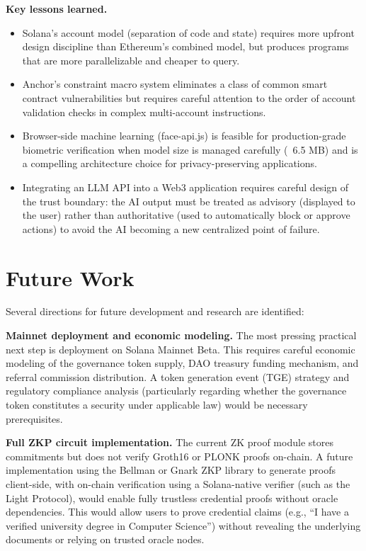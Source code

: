 \textbf{Key lessons learned.}
\begin{itemize}
    \item Solana's account model (separation of code and state) requires more upfront design discipline than Ethereum's combined model, but produces programs that are more parallelizable and cheaper to query.
    \item Anchor's constraint macro system eliminates a class of common smart contract vulnerabilities but requires careful attention to the order of account validation checks in complex multi-account instructions.
    \item Browser-side machine learning (face-api.js) is feasible for production-grade biometric verification when model size is managed carefully (~6.5 MB) and is a compelling architecture choice for privacy-preserving applications.
    \item Integrating an LLM API into a Web3 application requires careful design of the trust boundary: the AI output must be treated as advisory (displayed to the user) rather than authoritative (used to automatically block or approve actions) to avoid the AI becoming a new centralized point of failure.
\end{itemize}

\section{Future Work}
\label{section:6.2}

Several directions for future development and research are identified:

\textbf{Mainnet deployment and economic modeling.} The most pressing practical next step is deployment on Solana Mainnet Beta. This requires careful economic modeling of the governance token supply, DAO treasury funding mechanism, and referral commission distribution. A token generation event (TGE) strategy and regulatory compliance analysis (particularly regarding whether the governance token constitutes a security under applicable law) would be necessary prerequisites.

\textbf{Full ZKP circuit implementation.} The current ZK proof module stores commitments but does not verify Groth16 or PLONK proofs on-chain. A future implementation using the Bellman or Gnark ZKP library to generate proofs client-side, with on-chain verification using a Solana-native verifier (such as the Light Protocol), would enable fully trustless credential proofs without oracle dependencies. This would allow users to prove credential claims (e.g., ``I have a verified university degree in Computer Science'') without revealing the underlying documents or relying on trusted oracle nodes.

